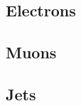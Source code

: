 \subsection{Electrons}
\label{subsec:ParticleRecon_Elec}

\subsection{Muons}
\label{subsec:ParticleRecon_Muon}

\subsection{Jets}
\label{subsec:ParticleRecon_Jets}
